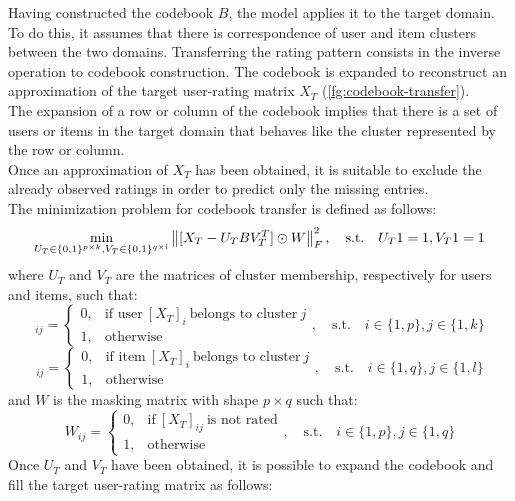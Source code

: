 Having constructed the codebook $B$, the model applies it to the target domain. To do this, it assumes that there is correspondence of user and item clusters between the two domains. Transferring the rating pattern consists in the inverse operation to codebook construction. The codebook is expanded to reconstruct an approximation of the target user-rating matrix $X_T$ (\autoref{fg:codebook-transfer}).\\
The expansion of a row or column of the codebook implies that there is a set of users or items in the target domain that behaves like the cluster represented by the row or column.\\
Once an approximation of $X_T$ has been obtained, it is suitable to exclude the already observed ratings in order to predict only the missing entries.\\
The minimization problem for codebook transfer is defined as follows:
\begin{equation}
\min_{U_T \in \{0,1\}^{p \times k}, V_T \in \{0,1\}^{q \times l}} \left\lVert[X_T - U_T B V_T^T] \odot W\right\rVert_F^2, \quad \text{s.t.} \quad U_T 1 = 1, V_T 1 = 1
\end{equation}
where $U_T$ and $V_T$ are the matrices of cluster membership, respectively for users and items, such that:
\begin{equation}
[U_T]_{ij} =
\begin{cases}
0, & \text{if user}\ [X_T]_{i}\ \text{belongs to cluster}\ j\\
1, & \text{otherwise}
\end{cases}
, \quad \text{s.t.} \quad i \in \{1,p\}, j \in \{1,k\}
\end{equation}
\begin{equation}
[V_T]_{ij} =
\begin{cases}
0, & \text{if item}\ [X_T]_{i}\ \text{belongs to cluster}\ j\\
1, & \text{otherwise}
\end{cases}
, \quad \text{s.t.} \quad i \in \{1,q\}, j \in \{1,l\}
\end{equation}
and $W$ is the masking matrix with shape $p \times q$ such that:
\begin{equation}
W_{ij} =
\begin{cases}
0, & \text{if}\ [X_T]_{ij}\ \text{is not rated}\\
1, & \text{otherwise}
\end{cases}
, \quad \text{s.t.} \quad i \in \{1,p\}, j \in \{1,q\}
\end{equation}
Once $U_T$ and $V_T$ have been obtained, it is possible to expand the codebook and fill the target user-rating matrix as follows:
